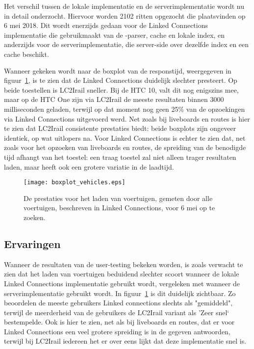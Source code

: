 Het verschil tussen de lokale implementatie en de serverimplementatie wordt nu in detail onderzocht. Hiervoor worden 2102 ritten opgezocht die plaatsvinden op 6 mei 2018. Dit wordt enerzijds gedaan voor de Linked Connections implementatie die gebruikmaakt van de -parser, cache en lokale index, en anderzijds voor de serverimplementatie, die server-side over dezelfde index en een cache beschikt.

Wanneer gekeken wordt naar de boxplot van de responstijd, weergegeven in figuur~\ref{fig:vehicleboxplot}, is te zien dat de Linked Connections duidelijk slechter presteert. Op beide toestellen is LC2Irail sneller. Bij de HTC 10, valt dit nog enigszins mee, maar op de HTC One zijn via LC2Irail de meeste resultaten binnen 3000 milliseconden geladen, terwijl op dat moment nog geen 25\% van de opzoekingen via Linked Connections uitgevoerd werd. Net zoals bij liveboards en routes is hier te zien dat LC2Irail consistente prestaties biedt: beide boxplots zijn ongeveer identiek, op wat uitlopers na. Voor Linked Connections is echter te zien dat, net zoals voor het opzoeken van liveboards en routes, de spreiding van de benodigde tijd afhangt van het toestel: een traag toestel zal niet alleen trager resultaten laden, maar heeft ook een grotere variatie in de laadtijd.

\begin{figure}[h]
	\centering
	\texttt{[image: boxplot\_vehicles.eps]}
	\caption[Prestaties voor het laden van voertuigen]{De prestaties voor het laden van voertuigen, gemeten door alle voertuigen, beschreven in Linked Connections, voor 6 mei op te zoeken.}
	\label{fig:vehicleboxplot}
\end{figure}


\subsection{Ervaringen}
Wanneer de resultaten van de user-testing bekeken worden, is zoals verwacht te zien dat het laden van voertuigen beduidend slechter scoort wanneer de lokale Linked Connections implementatie gebruikt wordt, vergeleken met wanneer de serverimplementatie gebruikt wordt. In figuur~\ref{fig:vehicleboxplot} is dit duidelijk zichtbaar. Zo beoordelen de meeste gebruikers Linked connections slechts als "gemiddeld", terwijl de meerderheid van de gebruikers de LC2Irail variant als 'Zeer snel` bestempelde. Ook is hier te zien, net als bij liveboards en routes, dat er voor Linked Connections een veel grotere spreiding is in de gegeven antwoorden, terwijl bij LC2Irail iedereen het er over eens lijkt dat deze implementatie snel is.

